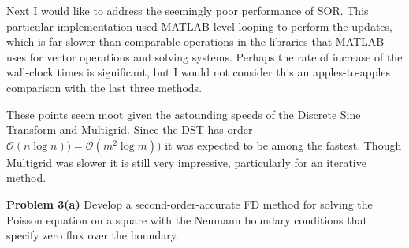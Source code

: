 \documentclass[12pt]{article}
\newcommand{\problem}[1]{\hspace{-4 ex} \large \textbf{Problem #1} }
\begin{document}
Next I would like to address the seemingly poor performance of SOR. This particular implementation used MATLAB level looping to perform the updates, which is far slower than comparable operations in the libraries that MATLAB uses for vector operations and solving systems. Perhaps the rate of increase of the wall-clock times is significant, but I would not consider this an apples-to-apples comparison with the last three methods. \bigbreak

These points seem moot given the astounding speeds of the Discrete Sine Transform and Multigrid. Since the DST has order $\mathcal{O}(n\log n)) = \mathcal{O}(m^2 \log m ))$ it was expected to be among the fastest. Though Multigrid was slower it is still very impressive, particularly for an iterative method.

\bigbreak
\problem{3(a)} Develop a second-order-accurate FD method for solving the Poisson equation on a square with the Neumann boundary conditions that specify zero flux over the boundary. \bigbreak
\end{document}
